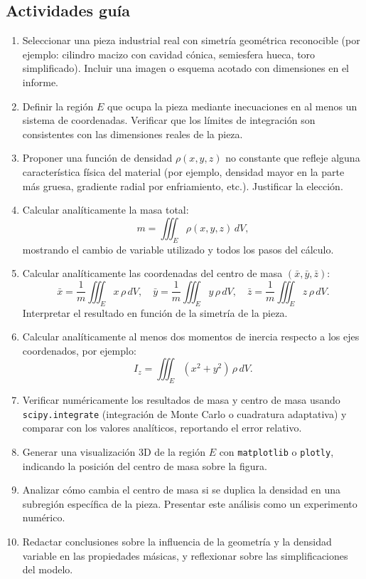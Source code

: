 \documentclass[a4,11pt]{aleph-notas}
\begin{document}
\subsection*{Actividades guía}
\begin{enumerate}[leftmargin=*, label={{\arabic*.}}]
    \item Seleccionar una pieza industrial real con simetría geométrica reconocible (por ejemplo: cilindro macizo con cavidad cónica, semiesfera hueca, toro simplificado). Incluir una imagen o esquema acotado con dimensiones en el informe.
    \item Definir la región $E$ que ocupa la pieza mediante inecuaciones en al menos un sistema de coordenadas. Verificar que los límites de integración son consistentes con las dimensiones reales de la pieza.
    \item Proponer una función de densidad $\rho(x,y,z)$ no constante que refleje alguna característica física del material (por ejemplo, densidad mayor en la parte más gruesa, gradiente radial por enfriamiento, etc.). Justificar la elección.
    \item Calcular analíticamente la {masa total}:
    \[
        m = \iiint_E \rho(x,y,z)\, dV,
    \]
    mostrando el cambio de variable utilizado y todos los pasos del cálculo.
    \item Calcular analíticamente las {coordenadas del centro de masa} $(\bar{x}, \bar{y}, \bar{z})$:
    \[
        \bar{x} = \frac{1}{m}\iiint_E x\,\rho\, dV, \quad
        \bar{y} = \frac{1}{m}\iiint_E y\,\rho\, dV, \quad
        \bar{z} = \frac{1}{m}\iiint_E z\,\rho\, dV.
    \]
    Interpretar el resultado en función de la simetría de la pieza.
    \item Calcular analíticamente al menos dos {momentos de inercia} respecto a los ejes coordenados, por ejemplo:
    \[
        I_z = \iiint_E (x^2+y^2)\,\rho\, dV.
    \]
    \item Verificar numéricamente los resultados de masa y centro de masa usando \texttt{scipy.integrate} (integración de Monte Carlo o cuadratura adaptativa) y comparar con los valores analíticos, reportando el error relativo.
    \item Generar una visualización 3D de la región $E$ con \texttt{matplotlib} o \texttt{plotly}, indicando la posición del centro de masa sobre la figura.
    \item Analizar cómo cambia el centro de masa si se duplica la densidad en una subregión específica de la pieza. Presentar este análisis como un experimento numérico.
    \item Redactar conclusiones sobre la influencia de la geometría y la densidad variable en las propiedades másicas, y reflexionar sobre las simplificaciones del modelo.
\end{enumerate}
\end{document}
